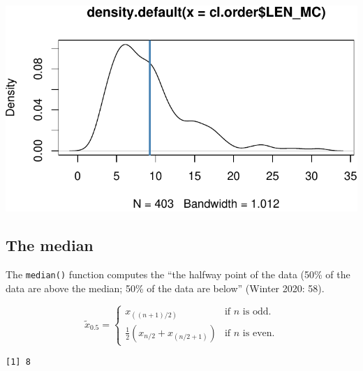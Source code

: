 \documentclass[
  11pt,
  letterpaper,
  DIV=11,
  numbers=noendperiod]{scrreprt}
\newenvironment{Shaded}{\begin{snugshade}}{\end{snugshade}}
\newcommand{\CommentTok}[1]{\textcolor[rgb]{0.37,0.37,0.37}{#1}}
\newcommand{\FunctionTok}[1]{\textcolor[rgb]{0.28,0.35,0.67}{#1}}
\newcommand{\NormalTok}[1]{\textcolor[rgb]{0.00,0.23,0.31}{#1}}
\newcommand{\SpecialCharTok}[1]{\textcolor[rgb]{0.37,0.37,0.37}{#1}}
\begin{document}
\includegraphics{Summary_statistics_files/figure-pdf/unnamed-chunk-7-1.pdf}

\subsection{The median}\label{the-median}

The \texttt{median()} function computes the ``the halfway point of the
data (50\% of the data are above the median; 50\% of the data are
below'' (Winter 2020: 58).

\[
\tilde{x}_{0.5} = 
\begin{cases}
x_{((n+1)/2)} & \text{if } n \text{ is odd.} \\
\frac{1}{2}(x_{n/2}+x_{(n/2+1)}) & \text{if } n \text{ is even.}
\end{cases} 
\]

\begin{Shaded}
\end{Shaded}

\begin{verbatim}
[1] 8
\end{verbatim}
\end{document}
